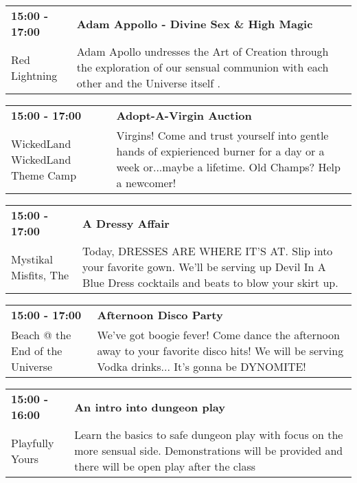 \begin{tabular}{ p{1in} p{2.2in} }
    \textbf{15:00 - 17:00} & \textbf{Adam Appollo - Divine Sex \& High Magic} \\
    Red Lightning \newline  & Adam Apollo undresses the Art of Creation through the exploration of our sensual communion with each other and the Universe itself . \\
    \hline 
\end{tabular}
    
\begin{tabular}{ p{1in} p{2.2in} }
    \textbf{15:00 - 17:00} & \textbf{Adopt-A-Virgin Auction} \\
    WickedLand \newline WickedLand Theme Camp & Virgins! Come and trust yourself into gentle hands of expierienced burner for a day or a week or...maybe a lifetime. Old Champs? Help a newcomer! \\
    \hline 
\end{tabular}
    
\begin{tabular}{ p{1in} p{2.2in} }
    \textbf{15:00 - 17:00} & \textbf{A Dressy Affair} \\
    Mystikal Misfits, The \newline  & Today, DRESSES ARE WHERE IT'S AT. Slip into your favorite gown. We'll be serving up Devil In A Blue Dress cocktails and beats to blow your skirt up. \\
    \hline 
\end{tabular}
    
\begin{tabular}{ p{1in} p{2.2in} }
    \textbf{15:00 - 17:00} & \textbf{Afternoon Disco Party} \\
    Beach @ the End of the Universe \newline  & We've got boogie fever! Come dance the afternoon away to your favorite disco hits! We will be serving Vodka drinks... It's gonna be DYNOMITE! \\
    \hline 
\end{tabular}
    
\begin{tabular}{ p{1in} p{2.2in} }
    \textbf{15:00 - 16:00} & \textbf{An intro into dungeon play} \\
    Playfully Yours \newline  & Learn the basics to safe dungeon play with focus on the more sensual side. Demonstrations will be provided and there will be open play after the class \\
    \hline 
\end{tabular}
    
